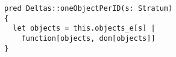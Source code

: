 \lstset{frame=tb, aboveskip=12pt, belowskip=-3pt, breaklines=true, basicstyle=\small\ttfamily, tabsize=2, mathescape=true}
\begin{lstlisting}[caption={deltas.als, lines 55-59}, label=alloy:savcbs-deltas-ok-V, captionpos=b]
pred Deltas::oneObjectPerID(s: Stratum)
{
  let objects = this.objects_e[s] |
    function[objects, dom[objects]]
}
\end{lstlisting}